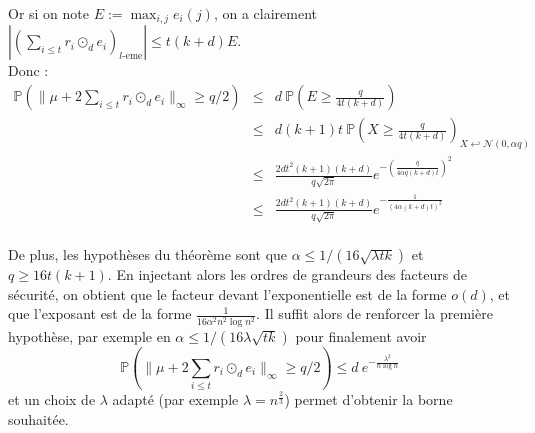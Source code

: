 \documentclass[11pt,a4paper]{article}
\begin{document}
Or si on note $E := \max_{i,j} e_i(j)$, on a clairement $|(\sum_{i \leq t}r_i \odot_d e_i)_{l\text{-eme}}|\leq t(k+d)E$. \\ Donc : 
\begin{eqnarray*}
\mathbb{P}(\|\mu + 2\sum_{i \leq t}r_i \odot_d e_i  \|_\infty \geq q/2 ) &\leq& d \ \mathbb{P}(E \geq \frac{q}{4t(k+d)}) \\
&\leq& d(k+1)t \ \mathbb{P}(X \geq \frac{q}{4t(k+d)})_{X \hookleftarrow \mathcal{N}(0,\alpha q)} \\
&\leq& \frac{2dt^2(k+1)(k+d)}{q \sqrt{2\pi}} e^{-(\frac{q}{4\alpha q (k+d) t})^2} \\
&\leq& \frac{2dt^2(k+1)(k+d)}{q \sqrt{2\pi}} e^{-\frac{1}{(4\alpha (k+d) t)^2}} \\
\end{eqnarray*}

De plus, les hypothèses du théorème sont que $\alpha \leq 1/(16\sqrt{\lambda t k})$ et $q \geq 16t(k+1)$. En injectant alors les ordres de grandeurs des facteurs de sécurité, on obtient que le facteur devant l'exponentielle est de la forme $o(d)$, et que l'exposant est de la forme $\frac{1}{16 \alpha^2 n^2 \log{n}^2}$. Il suffit alors de renforcer la première hypothèse, par exemple en $\alpha \leq 1/(16\lambda\sqrt{t k})$ pour finalement avoir \[\mathbb{P}(\|\mu + 2\sum_{i \leq t}r_i \odot_d e_i  \|_\infty \geq q/2 ) \leq d \ e^{- \frac{\lambda^2}{n\log{n}}}\] et un choix de $\lambda$ adapté (par exemple $\lambda = n^{\frac{2}{3}}$) permet d'obtenir la borne souhaitée.





\printbibliography[heading=bibintoc, title={Références}]
\end{document}
